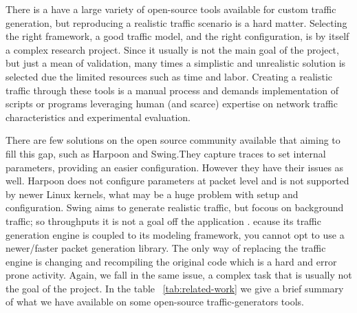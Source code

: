 There is a  have a large variety of open-source tools available for custom traffic generation, but reproducing a realistic traffic scenario is a hard matter. Selecting the right framework, a good traffic model, and the right configuration, is by itself a complex research project\cite{legotg-paper}\cite{selfsimilar-ethernet}. Since it usually is not the main goal of the project, but just a mean of validation, many times a simplistic and unrealistic solution is selected due the limited resources such as time and labor.  Creating a realistic traffic through these tools is a manual process and demands implementation of scripts or programs leveraging human (and scarce) expertise on network traffic characteristics  and experimental evaluation. 


There are few solutions on the open source community available that aiming to fill this gap, such as Harpoon\cite{harpoon-paper} and Swing\cite{swing-paper}.They capture traces to set internal parameters, providing an easier configuration. However they have their issues as well. Harpoon does not configure parameters at packet level\cite{harpoon-paper} and is not supported by newer Linux kernels, what may be a huge problem with setup and configuration. Swing\cite{swing-paper} aims to generate realistic traffic, but focous on background traffic; so throughputs it is not a goal off the application\cite{swing-paper} \cite{legotg-paper}. ecause its traffic generation engine is coupled to its modeling framework, you cannot opt to use a newer/faster packet generation library. The only way of replacing the traffic engine is changing and recompiling the original code which is a hard and  error prone activity\cite{legotg-paper}. Again, we fall in the same issue, a complex task that is usually not the goal of the project. In the table ~\ref{tab:related-work} we give a brief summary of what we have available on some open-source traffic-generators tools. 




